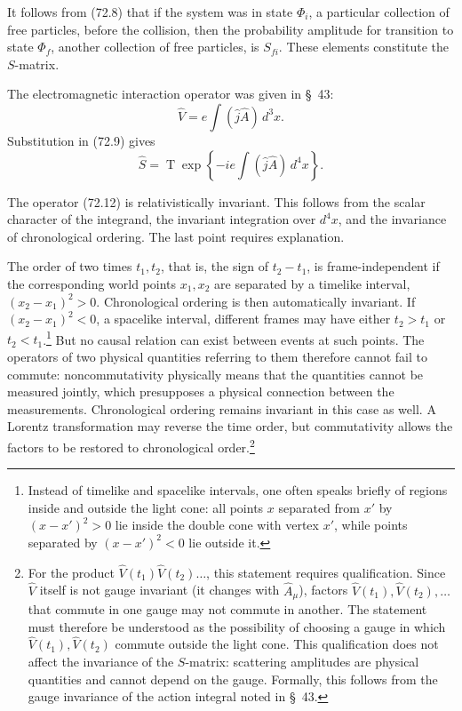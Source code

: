 It follows from (72.8) that if the system was in state $\Phi_i$, a particular collection of free particles, before the collision, then the probability amplitude for transition to state $\Phi_f$, another collection of free particles, is $S_{fi}$. These elements constitute the $S$-matrix.

The electromagnetic interaction operator was given in \S~43:
\begin{equation}
\hat V=e\int(\hat j\hat A)\,d^3x.
\tag{72.11}
\end{equation}
Substitution in (72.9) gives
\begin{equation}
\hat S=\mathop{\mathrm T}\exp\left\{-ie\int(\hat j\hat A)\,d^4x\right\}.
\tag{72.12}
\end{equation}

The operator (72.12) is relativistically invariant. This follows from the scalar character of the integrand, the invariant integration over $d^4x$, and the invariance of chronological ordering. The last point requires explanation.

The order of two times $t_1,t_2$, that is, the sign of $t_2-t_1$, is frame-independent if the corresponding world points $x_1,x_2$ are separated by a timelike interval, $(x_2-x_1)^2>0$. Chronological ordering is then automatically invariant. If $(x_2-x_1)^2<0$, a spacelike interval, different frames may have either $t_2>t_1$ or $t_2<t_1$.\footnote{Instead of timelike and spacelike intervals, one often speaks briefly of regions inside and outside the light cone: all points $x$ separated from $x'$ by $(x-x')^2>0$ lie inside the double cone with vertex $x'$, while points separated by $(x-x')^2<0$ lie outside it.} But no causal relation can exist between events at such points. The operators of two physical quantities referring to them therefore cannot fail to commute: noncommutativity physically means that the quantities cannot be measured jointly, which presupposes a physical connection between the measurements. Chronological ordering remains invariant in this case as well. A Lorentz transformation may reverse the time order, but commutativity allows the factors to be restored to chronological order.\footnote{For the product $\hat V(t_1)\hat V(t_2)\ldots$, this statement requires qualification. Since $\hat V$ itself is not gauge invariant (it changes with $\hat A_\mu$), factors $\hat V(t_1),\hat V(t_2),\ldots$ that commute in one gauge may not commute in another. The statement must therefore be understood as the possibility of choosing a gauge in which $\hat V(t_1),\hat V(t_2)$ commute outside the light cone. This qualification does not affect the invariance of the $S$-matrix: scattering amplitudes are physical quantities and cannot depend on the gauge. Formally, this follows from the gauge invariance of the action integral noted in \S~43.}

